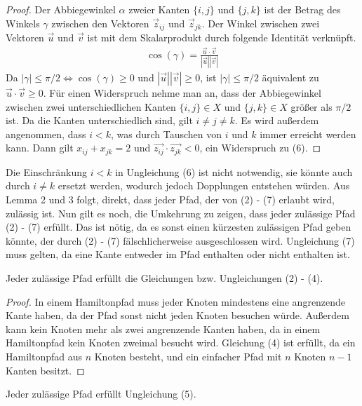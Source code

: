 \documentclass[a4paper, 10pt, ngerman]{article}
\begin{document}
\begin{proof}
    Der Abbiegewinkel $\alpha$ zweier Kanten $\{i, j\}$ und $\{j, k\}$ ist der Betrag des Winkels $\gamma$ zwischen den Vektoren $\vec z_{ij}$ und $\vec z_{jk}$. Der Winkel zwischen zwei Vektoren $\vec u$ und $\vec v$ ist mit dem Skalarprodukt durch folgende Identität verknüpft.
    \begin{align*}
        \cos(\gamma) = \frac {\vec{u} \cdot \vec{v}} {|\vec{u}||\vec{v}|}
    \end{align*}
    Da $|\gamma| \le \pi / 2 \Longleftrightarrow \cos(\gamma) \ge 0$ und $|\vec{u}| |\vec{v}| \ge 0$, ist $|\gamma| \le \pi / 2$ äquivalent zu $\vec{u} \cdot \vec{v} \ge 0$. Für einen Widerspruch nehme man an, dass der Abbiegewinkel zwischen zwei unterschiedlichen Kanten $\{i, j\} \in X$ und $\{j, k\} \in X$ größer als $\pi / 2$ ist. Da die Kanten unterschiedlich sind, gilt $i \ne j \ne k$. Es wird außerdem angenommen, dass $i < k$, was durch Tauschen von $i$ und $k$ immer erreicht werden kann. Dann gilt $x_{ij} + x_{jk} = 2$ und $\vec{z_{ij}} \cdot \vec{z_{jk}} < 0$, ein Widerspruch zu (6). 
\end{proof}

Die Einschränkung $i < k$ in Ungleichung (6) ist nicht notwendig, sie könnte auch durch $i \ne k$ ersetzt werden, wodurch jedoch Dopplungen entstehen würden. Aus Lemma 2 und 3 folgt, direkt, dass jeder Pfad, der von (2) - (7) erlaubt wird, zulässig ist. Nun gilt es noch, die Umkehrung zu zeigen, dass jeder zulässige Pfad (2) - (7) erfüllt. Das ist nötig, da es sonst einen kürzesten zulässigen Pfad geben könnte, der durch (2) - (7) fälschlicherweise ausgeschlossen wird. Ungleichung (7) muss gelten, da eine Kante entweder im Pfad enthalten oder nicht enthalten ist.

\begin{lemma}
    Jeder zulässige Pfad erfüllt die Gleichungen bzw. Ungleichungen (2) - (4).
\end{lemma}

\begin{proof}
    In einem Hamiltonpfad muss jeder Knoten mindestens eine angrenzende Kante haben, da der Pfad sonst nicht jeden Knoten besuchen würde. Außerdem kann kein Knoten mehr als zwei angrenzende Kanten haben, da in einem Hamiltonpfad kein Knoten zweimal besucht wird. Gleichung (4) ist erfüllt, da ein Hamiltonpfad aus $n$ Knoten besteht, und ein einfacher Pfad mit $n$ Knoten $n - 1$ Kanten besitzt.
\end{proof}

\begin{lemma}
    Jeder zulässige Pfad erfüllt Ungleichung (5).
\end{lemma}
\end{document}
